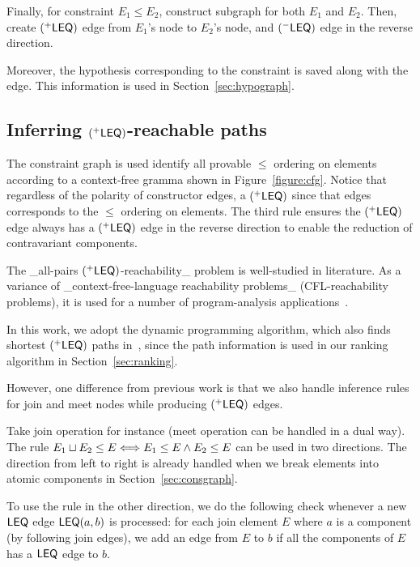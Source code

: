 Finally, for constraint $E_1\leq E_2$, construct subgraph for both
$E_1$ and $E_2$. Then, create $(^{+}\mathsf{LEQ})$ edge from $E_1$'s
node to $E_2$'s node, and $(^{-}\mathsf{LEQ})$ edge in the reverse
direction. 

Moreover, the hypothesis corresponding to the constraint is saved
along with the edge. This information is used in
Section~\ref{sec:hypograph}.

\subsection{Inferring $(^{+}\mathsf{LEQ})$-reachable paths}
\label{sec:leqedge}

The constraint graph is used identify all provable $\leq$ ordering on
elements according to a context-free gramma shown in
Figure~\ref{figure:cfg}. Notice that regardless of the polarity of
constructor edges, a $(^{+}\mathsf{LEQ})$ since that edges
corresponds to the $\leq$ ordering on elements. The third rule ensures
the $(^{+}\mathsf{LEQ})$ edge always has a $(^{+}\mathsf{LEQ})$ edge
in the reverse direction to enable the reduction of contravariant
components.

The _all-pairs $(^{+}\mathsf{LEQ})$-reachability_ problem is
well-studied in literature\cite{melski-cflgraph,barrett-cflpath}. As a
variance of _context-free-language reachability problems_
(CFL-reachability problems), it is used for a number of
program-analysis applications~\cite{reps-graph}. 

In this work, we adopt the dynamic programming algorithm, which also
finds shortest $(^{+}\mathsf{LEQ})$ paths in~\cite{barrett-cflpath},
since the path information is used in our ranking algorithm in
Section~\ref{sec:ranking}.

However, one difference from previous work is that we also handle
inference rules for join and meet nodes while producing
$(^{+}\mathsf{LEQ})$ edges.

Take join operation for instance (meet operation can be handled in a
dual way). The rule $E_1\sqcup E_2\leq E \Longleftrightarrow E_1\leq E \land E_2 \leq
E $ can be used in two directions. The direction from left to right is
already handled when we break elements into atomic components in
Section~\ref{sec:consgraph}.

To use the rule in the other direction, we do the following check
whenever a new $\mathsf{LEQ}$ edge $\mathsf{LEQ}(a,b)$ is processed: for each join
element $E$ where $a$ is a component (by following join edges), we add
an edge from $E$ to $b$ if all the components of $E$ has a $\mathsf{LEQ}$ edge
to $b$. 

